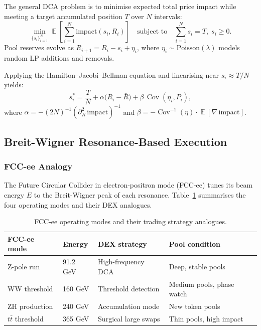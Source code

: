 \documentclass[12pt,a4paper]{article}
\DeclareMathOperator{\E}{\mathbb{E}}
\DeclareMathOperator{\Cov}{\mathrm{Cov}}
\begin{document}
The general DCA problem is to minimise expected total price impact while
meeting a target accumulated position $T$ over $N$ intervals:
\begin{equation}
\min_{\{s_i\}_{i=1}^N} \E\!\left[\sum_{i=1}^N \mathrm{impact}(s_i, R_i)\right]
\quad \text{subject to} \quad \sum_{i=1}^N s_i = T,\; s_i \geq 0.
\label{eq:soc-problem}
\end{equation}
Pool reserves evolve as $R_{i+1} = R_i - s_i + \eta_i$, where $\eta_i \sim
\mathrm{Poisson}(\lambda)$ models random LP additions and removals.

Applying the Hamilton--Jacobi--Bellman equation and linearising near $s_i \approx T/N$ yields:
\begin{equation}
s_i^* = \frac{T}{N} + \alpha\bigl(R_i - \bar{R}\bigr) + \beta\,\Cov(\eta_i, P_i),
\label{eq:soc-solution}
\end{equation}
where $\alpha = -(2N)^{-1}(\partial^2_R \,\mathrm{impact})^{-1}$ and
$\beta = -\Cov^{-1}(\eta)\cdot\E[\nabla\,\mathrm{impact}]$.

\subsection{Breit-Wigner Resonance-Based Execution}
\label{sec:breit-wigner}

\subsubsection{FCC-ee Analogy}

The Future Circular Collider in electron-positron mode (FCC-ee) tunes its
beam energy $E$ to the Breit-Wigner peak of each resonance.  Table~\ref{tab:fcc-ee}
summarises the four operating modes and their DEX analogues.

\begin{table}[ht]
\centering
\caption{FCC-ee operating modes and their trading strategy analogues.}
\label{tab:fcc-ee}
\begin{tabular}{llll}
\toprule
\textbf{FCC-ee mode} & \textbf{Energy} & \textbf{DEX strategy} & \textbf{Pool condition} \\
\midrule
Z-pole run     & 91.2 GeV & High-frequency DCA      & Deep, stable pools \\
WW threshold   & 160 GeV  & Threshold detection     & Medium pools, phase watch \\
ZH production  & 240 GeV  & Accumulation mode       & New token pools \\
$t\bar t$ threshold & 365 GeV & Surgical large swaps & Thin pools, high impact \\
\bottomrule
\end{tabular}
\end{table}
\end{document}
